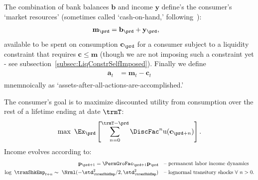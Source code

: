 \documentclass[titlepage, headings=optiontotocandhead]{econtex}
\begin{document}
The combination of bank balances $\mathbf{b}$ and income $\mathbf{y}$ define's the consumer's `market resources' (sometimes called `cash-on-hand,' following~\cite{deatonUnderstandingC}):
\begin{equation}\begin{gathered}\begin{aligned}
      \mathbf{m}_{\prd} & = \mathbf{b}_{\prd}+\mathbf{y}_{\prd} \label{eq:mLvl},
    \end{aligned}\end{gathered}\end{equation}
available to be spent on consumption $\mathbf{c}_{\prd}$ for a consumer subject to a liquidity constraint that requires $\mathbf{c} \leq \mathbf{m}$ (though we are not imposing such a constraint yet - see subsection~\ref{subsec:LiqConstrSelfImposed}).  Finally we define
  \begin{equation}\begin{gathered}\begin{aligned}\label{eq:aLvl}
    \mathbf{a}_{t} & = \mathbf{m}_{t}-\mathbf{c}_{t} 
      \end{aligned}\end{gathered}\end{equation}
mnemnoically as `assets-after-all-actions-are-accomplished.' 

The consumer's goal is to maximize discounted utility from consumption over the rest of a lifetime ending at date $\trmT$:
  \begin{equation}\label{eq:MaxProb}
    \max~\Ex_{\prd}\left[\sum_{n=0}^{\trmT-\prd}\DiscFac^{n} \mathrm{u}(\mathbf{c}_{\prd+n})\right].
  \end{equation}
Income evolves according to:
  \begin{equation}\begin{gathered}\begin{aligned}
        \mathbf{p}_{\prd+1}   = \PermGroFac_{\prd+1}\mathbf{p}_{\prd}                                        & \text{~~ -- permanent labor income dynamics} \label{eq:permincgrow}
        \\ \log ~ \tranShkEmp_{t+n}  \sim ~\Nrml(-\std_{\tranShkEmp}^{2}/2,\std_{\tranShkEmp}^{2}) & \text{~~ -- lognormal transitory shocks}~\forall~n>0 .
      \end{aligned}\end{gathered}\end{equation}
\end{document}
